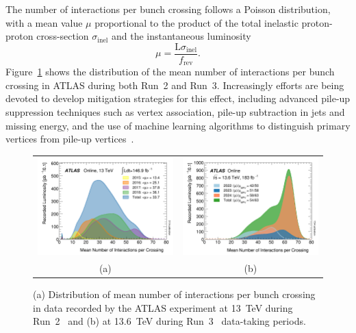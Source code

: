 The number of interactions per bunch crossing follows a Poisson distribution, with a mean value $\mu$ proportional to the product of the total inelastic proton-proton cross-section $\sigma_{\text{inel}}$ and the instantaneous luminosity~\cite{pileup}
\begin{equation}
    \mu = \frac{\text{L}\sigma_{\text{inel}}}{f_{\text{rev}}}.
\end{equation}
Figure~\ref{fig:pileup} shows the distribution of the mean number of interactions per bunch crossing in ATLAS during both Run~2 and Run~3.
Increasingly efforts are being devoted to develop mitigation strategies for this effect, including advanced pile-up suppression techniques such as vertex association, pile-up subtraction in jets and missing energy, and the use of machine learning algorithms to distinguish primary vertices from pile-up vertices~\cite{ATL-PHYS-PUB-2023-011,ATLAS:2017pfq,Soyez_2019}.
\begin{figure}[htbp]
    \centering
    \begin{tabular}{cc}
        \includegraphics[width=0.5\linewidth]{images/mu_2015_2018.png} &
        \includegraphics[width=0.5\linewidth]{images/mu_2022_2024.png} \\
        (a) & (b)  \\
    \end{tabular}
    \caption{(a) Distribution of mean number of interactions per bunch crossing in data recorded by the ATLAS experiment at 13~TeV during Run~2~\cite{atlas:Run2lumi} and  (b) at 13.6~TeV during Run~3~\cite{atlas:Run2lumi} data-taking periods.}
    \label{fig:pileup}
    \end{figure}
